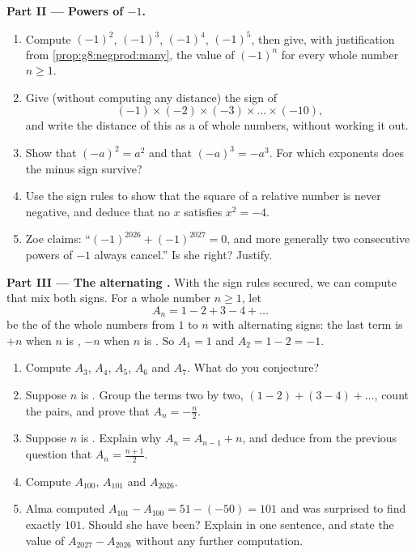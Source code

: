 \begin{problem}
\medskip
\noindent\textbf{Part II --- Powers of $-1$.}
\begin{enumerate}[resume]
  \item Compute $(-1)^2$, $(-1)^3$, $(-1)^4$, $(-1)^5$, then give,
        with justification from \cref{prop:g8:negprod:many}, the
        value of $(-1)^n$ for every whole number $n \geq 1$.
  \item Give (without computing any distance) the sign of
        \[
        (-1) \times (-2) \times (-3) \times \dots \times (-10),
        \]
        and write the distance of this  as a  of whole
        numbers, without working it out.
  \item Show that $(-a)^2 = a^2$ and that $(-a)^3 = -a^3$. For which
        exponents does the minus sign survive?
  \item Use the sign rules to show that the square of a relative
        number is never negative, and deduce that no 
        $x$ satisfies $x^2 = -4$.
  \item Zoe claims: ``$(-1)^{2026} + (-1)^{2027} = 0$, and more
        generally two consecutive powers of $-1$ always cancel.'' Is
        she right? Justify.
\end{enumerate}

\medskip
\noindent\textbf{Part III --- The alternating .}
With the sign rules secured, we can compute  that mix both
signs. For a whole number $n \geq 1$, let
\[
A_n = 1 - 2 + 3 - 4 + \dots
\]
be the  of the whole numbers from $1$ to $n$ with alternating
signs: the last term is $+n$ when $n$ is , $-n$ when $n$ is
. So $A_1 = 1$ and $A_2 = 1 - 2 = -1$.
\begin{enumerate}[resume]
  \item Compute $A_3$, $A_4$, $A_5$, $A_6$ and $A_7$. What do you
        conjecture?
  \item Suppose $n$ is . Group the terms two by two,
        $(1 - 2) + (3 - 4) + \dots$, count the pairs, and prove that
        $A_n = -\frac{n}{2}$.
  \item Suppose $n$ is . Explain why $A_n = A_{n-1} + n$, and
        deduce from the previous question that
        $A_n = \frac{n + 1}{2}$.
  \item Compute $A_{100}$, $A_{101}$ and $A_{2026}$.
  \item Alma computed $A_{101} - A_{100} = 51 - (-50) = 101$ and was
        surprised to find exactly $101$. Should she have been?
        Explain in one sentence, and state the value of
        $A_{2027} - A_{2026}$ without any further computation.
\end{enumerate}
\end{problem}
